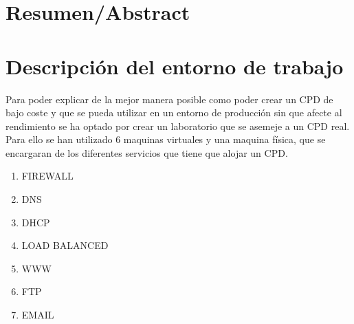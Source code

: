 \section[Resumen/Abstract]{Resumen/Abstract}
\begin{abstract}
	Estos son los puntos que hay que tratar en la memoria de la aplicación android
	\begin{itemize}
		\item Hay que poner el objetivo de la aplicación (breve descripción)
		\item Motivación de la misma (el por que he escogido hacer eso)
		\item Cuales son las consultas que he hecho con los interesados (Posibles clientes)
		\item Cuales son las consultas realizadas con los proveedores (Posibles proveedores)
		\item A nivel de programación cuales han sido las decisiones tomadas y por que
		\item 
	\end{itemize}
	\begin{multicols}{2}
		
	\end{multicols}
\end{abstract}
\thispagestyle{empty} %
\clearpage

\section{Descripción del entorno de trabajo}
Para poder explicar de la mejor manera posible como poder crear un CPD de bajo coste y que se pueda utilizar en un entorno de producción sin que afecte al rendimiento se ha optado por crear un laboratorio que se asemeje a un CPD real.\\
Para ello se han utilizado 6 maquinas virtuales y una maquina física, que se encargaran de los diferentes servicios que tiene que alojar un CPD.

\begin{enumerate}
	\setlength\itemsep{1px} %
	\item FIREWALL
	\item DNS
	\item DHCP
	\item LOAD BALANCED
	\item WWW
	\item FTP
	\item EMAIL
\end{enumerate}

